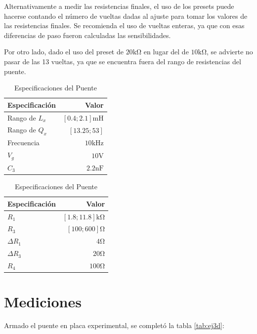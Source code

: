     Alternativamente a medir las resistencias finales, el uso de los presets puede hacerse
    contando el número de vueltas dadas al ajuste para tomar los valores de las resistencias
    finales. Se recomienda el uso de vueltas enteras, ya que con esas diferencias de paso
    fueron calculadas las sensibilidades.

    Por otro lado, dado el uso del preset de $20\si{\kilo\ohm}$ en lugar del de $10\si{\kilo\ohm}$,
    se advierte no pasar de las 13 vueltas, ya que se encuentra fuera del rango de resistencias
    del puente.

    \begin{table}[h]
        \begin{center}
            \begin{tabular}{|l|r|}
                \hline
                Especificación & Valor \\
                \hline
                Rango de $L_x$ & $[0.4;2.1]\si{\milli\henry}$ \\
                Rango de $Q_x$ & $ [13.25; 53] $ \\
                Frecuencia & $10\si{\kilo\hertz}$\\
                $V_g$ & $10\si{\volt}$\\
                $C_3$ & $2.2\si{\nano\farad}$\\
                \hline
            \end{tabular}
            \begin{tabular}{|l|r|}
                \hline
                Especificación & Valor \\
                \hline
                $R_1$ & $[1.8;11.8]\si{\kilo\ohm}$\\
                $R_3$ & $[100;600]\si{\ohm}$\\
                $\Delta R_1$ & $4\si{\ohm}$ \\
                $\Delta R_3$ & $20\si{\ohm}$ \\
                $R_4$ & $100\si{\ohm}$\\
                \hline
            \end{tabular}
            \caption{Especificaciones del Puente}
            \label{tab:ej3specFin}
        \end{center}
    \end{table}

    \section{Mediciones}
    Armado el puente en placa experimental, se completó la tabla \ref{tab:ej3d}:
    

